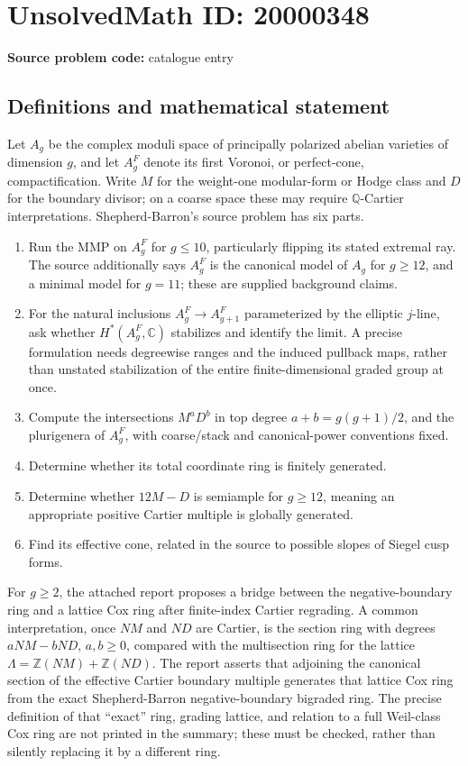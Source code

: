 \documentclass[11pt]{article}
\newcommand{\Z}{\mathbb{Z}}
\newcommand{\Q}{\mathbb{Q}}
\newcommand{\C}{\mathbb{C}}
\begin{document}
\section*{UnsolvedMath ID: 20000348}
\textbf{Source problem code:} catalogue entry
\subsection{Definitions and mathematical statement}
Let \(A_g\) be the complex moduli space of principally polarized abelian varieties of dimension \(g\), and let \(A_g^F\) denote its first Voronoi, or perfect-cone, compactification. Write \(M\) for the weight-one modular-form or Hodge class and \(D\) for the boundary divisor; on a coarse space these may require \(\Q\)-Cartier interpretations. Shepherd-Barron's source problem has six parts.
\begin{enumerate}
\item Run the MMP on \(A_g^F\) for \(g\leq10\), particularly flipping its stated extremal ray. The source additionally says \(A_g^F\) is the canonical model of \(A_g\) for \(g\geq12\), and a minimal model for \(g=11\); these are supplied background claims.
\item For the natural inclusions \(A_g^F\to A_{g+1}^F\) parameterized by the elliptic \(j\)-line, ask whether \(H^*(A_g^F,\C)\) stabilizes and identify the limit. A precise formulation needs degreewise ranges and the induced pullback maps, rather than unstated stabilization of the entire finite-dimensional graded group at once.
\item Compute the intersections \(M^aD^b\) in top degree \(a+b=g(g+1)/2\), and the plurigenera of \(A_g^F\), with coarse/stack and canonical-power conventions fixed.
\item Determine whether its total coordinate ring is finitely generated.
\item Determine whether \(12M-D\) is semiample for \(g\geq12\), meaning an appropriate positive Cartier multiple is globally generated.
\item Find its effective cone, related in the source to possible slopes of Siegel cusp forms.
\end{enumerate}

For \(g\geq2\), the attached report proposes a bridge between the negative-boundary ring and a lattice Cox ring after finite-index Cartier regrading. A common interpretation, once \(NM\) and \(ND\) are Cartier, is the section ring with degrees \(aNM-bND\), \(a,b\geq0\), compared with the multisection ring for the lattice \(\Lambda=\Z(NM)+\Z(ND)\). The report asserts that adjoining the canonical section of the effective Cartier boundary multiple generates that lattice Cox ring from the exact Shepherd-Barron negative-boundary bigraded ring. The precise definition of that ``exact'' ring, grading lattice, and relation to a full Weil-class Cox ring are not printed in the summary; these must be checked, rather than silently replacing it by a different ring.
\end{document}
